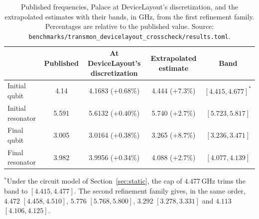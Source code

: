 \documentclass{anvil-paper}
\begin{document}
\begin{table}[htbp]
  \centering
  \caption{Published frequencies, Palace at DeviceLayout's discretization,
  and the extrapolated estimates with their bands, in GHz, from the first
  refinement family. Percentages are relative to the published value.
  Source: \texttt{benchmarks/transmon\_devicelayout\_crosscheck/results.toml}.}
  \label{tab:crosscheck}
  \footnotesize
  \begin{tabular}{@{}lcccc@{}}
    \toprule
    & Published & At DeviceLayout's discretization & Extrapolated estimate & Band \\
    \midrule
    Initial qubit & 4.14 & 4.1683 ($+0.68\%$) & 4.444 ($+7.3\%$) & $[4.415, 4.677]^{\ast}$ \\
    Initial resonator & 5.591 & 5.6132 ($+0.40\%$) & 5.740 ($+2.7\%$) & $[5.723, 5.817]$ \\
    Final qubit & 3.005 & 3.0164 ($+0.38\%$) & 3.265 ($+8.7\%$) & $[3.236, 3.471]$ \\
    Final resonator & 3.982 & 3.9956 ($+0.34\%$) & 4.088 ($+2.7\%$) & $[4.077, 4.139]$ \\
    \bottomrule
  \end{tabular}

  \smallskip
  {\footnotesize $^{\ast}$Under the circuit model of
  Section~\ref{sec:static}, the cap of $4.477$\,GHz trims the band to
  $[4.415, 4.477]$. The second refinement family gives, in the same order,
  $4.472$ $[4.458, 4.510]$, $5.776$ $[5.768, 5.800]$, $3.292$ $[3.278,
  3.331]$ and $4.113$ $[4.106, 4.125]$.}
\end{table}
\end{document}
